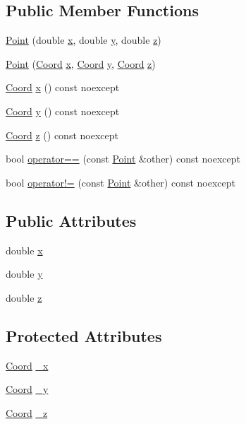 \subsection*{Public Member Functions}
\begin{DoxyCompactItemize}
\item 
\hyperlink{struct_point_a4d43f5247afe8c85c6da1aa39dbcc738}{Point} (double \hyperlink{struct_point_ab99c56589bc8ad5fa5071387110a5bc7}{x}, double \hyperlink{struct_point_afa38be143ae800e6ad69ce8ed4df62d8}{y}, double \hyperlink{struct_point_a05ba3b1dfcb19430582ae953cbbfbded}{z})
\item 
\hyperlink{struct_point_abcbc44cd825a9fc26fc9027256cf4cb4}{Point} (\hyperlink{struct_coord}{Coord} \hyperlink{struct_point_ab99c56589bc8ad5fa5071387110a5bc7}{x}, \hyperlink{struct_coord}{Coord} \hyperlink{struct_point_afa38be143ae800e6ad69ce8ed4df62d8}{y}, \hyperlink{struct_coord}{Coord} \hyperlink{struct_point_a05ba3b1dfcb19430582ae953cbbfbded}{z})
\item 
\hyperlink{struct_coord}{Coord} \hyperlink{struct_point_add97959f26c755fb67ca78ebfb616aaa}{x} () const noexcept
\item 
\hyperlink{struct_coord}{Coord} \hyperlink{struct_point_a5c9b4a820e0b6cde951c68a0244ee39e}{y} () const noexcept
\item 
\hyperlink{struct_coord}{Coord} \hyperlink{struct_point_a848473c2345430a5bcd4d87a8e46f264}{z} () const noexcept
\item 
bool \hyperlink{struct_point_a4fcabfb4a4f656779cc2ea87d1564a37}{operator==} (const \hyperlink{struct_point}{Point} \&other) const noexcept
\item 
bool \hyperlink{struct_point_ace1f99f1c41319502f2377569a67c3ca}{operator!=} (const \hyperlink{struct_point}{Point} \&other) const noexcept
\end{DoxyCompactItemize}
\subsection*{Public Attributes}
\begin{DoxyCompactItemize}
\item 
double \hyperlink{struct_point_ab99c56589bc8ad5fa5071387110a5bc7}{x}
\item 
double \hyperlink{struct_point_afa38be143ae800e6ad69ce8ed4df62d8}{y}
\item 
double \hyperlink{struct_point_a05ba3b1dfcb19430582ae953cbbfbded}{z}
\end{DoxyCompactItemize}
\subsection*{Protected Attributes}
\begin{DoxyCompactItemize}
\item 
\hyperlink{struct_coord}{Coord} \hyperlink{struct_point_a74492d96f1b1efe6813f748809a3679a}{\-\_\-x}
\item 
\hyperlink{struct_coord}{Coord} \hyperlink{struct_point_a98147cc10663ee1581decea4c8c0ba3d}{\-\_\-y}
\item 
\hyperlink{struct_coord}{Coord} \hyperlink{struct_point_a9ae6adfd6a9d2dc2269326b9857611a5}{\-\_\-z}
\end{DoxyCompactItemize}


